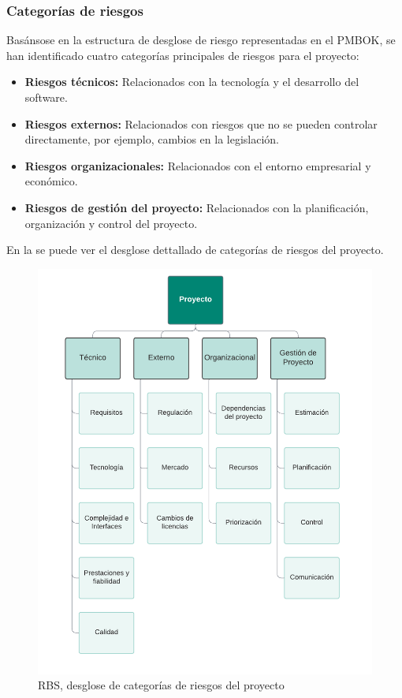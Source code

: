 \subsubsection*{Categorías de riesgos}
Basánsose en la estructura de desglose de riesgo representadas en el PMBOK, se han identificado cuatro categorías principales de riesgos para el proyecto:
\begin{itemize}
    \item \textbf{Riesgos técnicos:} Relacionados con la tecnología y el desarrollo del software.
    \item \textbf{Riesgos externos:} Relacionados con riesgos que no se pueden controlar directamente, por ejemplo, cambios en la legislación.
    \item \textbf{Riesgos organizacionales:} Relacionados con el entorno empresarial y económico.
    \item \textbf{Riesgos de gestión del proyecto:} Relacionados con la planificación, organización y control del proyecto.
\end{itemize}

En la  se puede ver el desglose dettallado de categorías de riesgos del proyecto.


\begin{figure}[H]
    \hypertarget{fig:A1_PGR_RBS}{}
    \centering
    \includegraphics[width=0.65\linewidth]{figures/A1_PGR_RBS.png}
    \caption{RBS, desglose de categorías de riesgos del proyecto}
    \label{fig:A1_PGR_RBS}
\end{figure}

